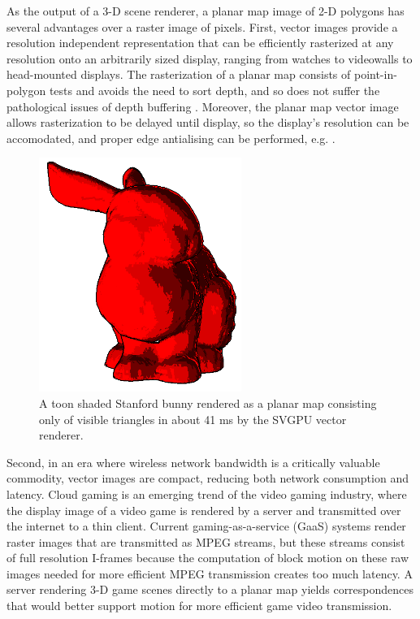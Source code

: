 \documentclass[review]{acmsiggraph}
\begin{document}
As the output of a 3-D scene renderer, a planar map image of 2-D polygons has
several advantages over a raster image of pixels. First, vector images provide
a resolution independent representation that can be efficiently rasterized at
any resolution onto an arbitrarily sized display, ranging from watches to
videowalls to head-mounted displays. The rasterization of a planar map consists
of point-in-polygon
tests and avoids the need to sort depth, and so does not suffer the
pathological issues of depth buffering \cite{wmap,etc}. Moreover, the planar
map vector image allows rasterization to be delayed until display, so the
display's resolution can be accomodated, and proper edge antialising can be
performed, e.g. \cite{manson2011}.

\begin{figure}[t] \centering
\includegraphics[height=3in]{images/bunny-red.png}
\caption{A toon shaded Stanford bunny rendered as a planar map consisting only
of visible triangles in about 41 ms by the SVGPU vector renderer.}
\end{figure}

Second, in an era where wireless network bandwidth is a critically
valuable commodity, vector images are compact, reducing both network
consumption and latency. Cloud gaming is an emerging trend of the video gaming
industry, where the display image of a video game is rendered by a server and
transmitted over the internet to a thin client. Current gaming-as-a-service
(GaaS) systems render raster images that are transmitted as MPEG streams, but
these streams consist of full resolution I-frames because the computation of
block motion on these raw images needed for more efficient MPEG transmission
creates too much latency. A server rendering 3-D game scenes directly to a
planar map yields correspondences that would better support motion for more
efficient game video transmission.
\end{document}
